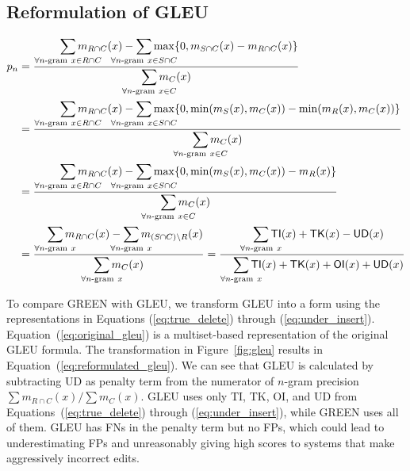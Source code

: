 \documentclass[11pt]{article}
\newcommand{\forallngramx}{\forall n\mathchar`-\mathrm{gram}\ x}
\begin{document}
\subsection{Reformulation of GLEU}
\label{sec:reformulation}

\begin{figure*}[!t]
    \begin{align}
        p_n & = \frac{\displaystyle \smashoperator[r]{\sum_{\forallngramx \in R \cap C}} m_{R \cap C} (x) - \smashoperator{\sum_{\forallngramx \in S \cap C}} \max\{0, m_{S \cap C} (x) - m_{R \cap C} (x)\}}{\displaystyle \smashoperator{\sum_{\forallngramx \in C}} m_C (x)} \label{eq:original_gleu} \\
        & = \frac{\displaystyle \smashoperator[r]{\sum_{\forallngramx \in R \cap C}} m_{R \cap C} (x) - \smashoperator{\sum_{\forallngramx \in S \cap C}} \max\{0, \min(m_S (x), m_C (x)) - \min(m_R (x), m_C (x))\}}{\displaystyle \smashoperator{\sum_{\forallngramx \in C}} m_C (x)} \nonumber \\
        & = \frac{\displaystyle \smashoperator[r]{\sum_{\forallngramx \in R \cap C}} m_{R \cap C} (x) - \smashoperator{\sum_{\forallngramx \in S \cap C}} \max\{0, \min(m_S (x), m_C (x)) - m_R (x)\}}{\displaystyle \smashoperator{\sum_{\forallngramx \in C}} m_C (x)} \nonumber \\
        & = \frac{\displaystyle \smashoperator[r]{\sum_{\forallngramx}} m_{R \cap C} (x) - \smashoperator{\sum_{\forallngramx}} m_{(S \cap C) \setminus R} (x)}{\displaystyle \smashoperator{\sum_{\forallngramx}} m_C (x)}
        = \frac{\smashoperator[r]{\sum_{\forallngramx}} \textsf{TI} (x) + \textsf{TK} (x) - \textsf{UD} (x)}{\smashoperator[r]{\sum_{\forallngramx}} \textsf{TI} (x) + \textsf{TK} (x) + \textsf{OI} (x) + \textsf{UD} (x)} \label{eq:reformulated_gleu}
    \end{align}
    \caption{Reformulation of GLEU.}
    \label{fig:gleu}
\end{figure*}

To compare GREEN with GLEU, we transform GLEU into a form using the representations in Equations (\ref{eq:true_delete}) through (\ref{eq:under_insert}).
Equation~(\ref{eq:original_gleu}) is a multiset-based representation of the original GLEU formula.
The transformation in Figure~\ref{fig:gleu} results in Equation~(\ref{eq:reformulated_gleu}).
We can see that GLEU is calculated by subtracting \textsf{UD} as penalty term from the numerator of $n$-gram precision $\sum m_{R \cap C} (x) / \sum m_{C} (x)$.
GLEU uses only \textsf{TI}, \textsf{TK}, \textsf{OI}, and \textsf{UD} from Equations~(\ref{eq:true_delete}) through (\ref{eq:under_insert}), while GREEN uses all of them.
GLEU has \textsf{FN}s in the penalty term but no \textsf{FP}s, which could lead to underestimating \textsf{FP}s and unreasonably giving high scores to systems that make aggressively incorrect edits.
\end{document}
